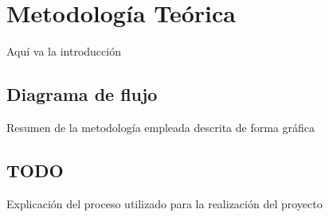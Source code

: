 \chapter{Metodología Teórica}
Aquí va la introducción

\section{Diagrama de flujo}
Resumen de la metodología empleada descrita de forma gráfica

\section{TODO}
Explicación del proceso utilizado para la realización del proyecto

